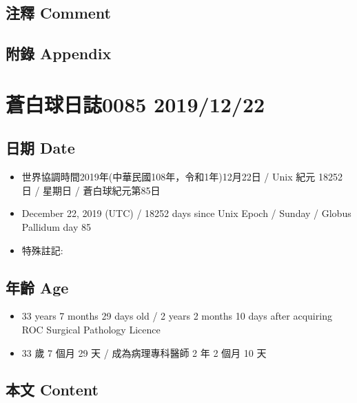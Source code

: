 \documentclass[a5paper, 12pt
]{book}
\providecommand{\tightlist}{%
  \setlength{\itemsep}{0pt}\setlength{\parskip}{0pt}}
\begin{document}
\hypertarget{ux6ce8ux91cb-comment-19}{%
\subsection{注釋 Comment}\label{ux6ce8ux91cb-comment-19}}

\hypertarget{ux9644ux9304-appendix-20}{%
\subsection{附錄 Appendix}\label{ux9644ux9304-appendix-20}}

\hypertarget{ux84bcux767dux7403ux65e5ux8a8c0085-20191222}{%
\section{蒼白球日誌0085
2019/12/22}\label{ux84bcux767dux7403ux65e5ux8a8c0085-20191222}}

\hypertarget{ux65e5ux671f-date-21}{%
\subsection{日期 Date}\label{ux65e5ux671f-date-21}}

\begin{itemize}
\tightlist
\item
  世界協調時間2019年(中華民國108年，令和1年)12月22日 / Unix 紀元 18252
  日 / 星期日 / 蒼白球紀元第85日
\item
  December 22, 2019 (UTC) / 18252 days since Unix Epoch / Sunday /
  Globus Pallidum day 85
\item
  特殊註記:
\end{itemize}

\hypertarget{ux5e74ux9f61-age-21}{%
\subsection{年齡 Age}\label{ux5e74ux9f61-age-21}}

\begin{itemize}
\tightlist
\item
  33 years 7 months 29 days old / 2 years 2 months 10 days after
  acquiring ROC Surgical Pathology Licence
\item
  33 歲 7 個月 29 天 / 成為病理專科醫師 2 年 2 個月 10 天
\end{itemize}

\hypertarget{ux672cux6587-content-21}{%
\subsection{本文 Content}\label{ux672cux6587-content-21}}
\end{document}
